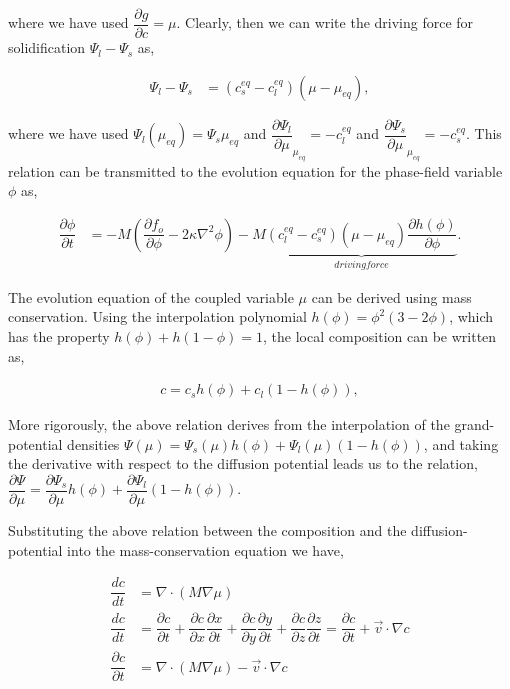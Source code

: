 \documentclass[a4paper]{report}
\begin{document}
  where we have used $\dfrac{\partial g}{\partial c}=\mu$. Clearly, then we can write 
  the driving force for solidification $\Psi_l-\Psi_s$ as,
  
  \begin{align}
   \Psi_l-\Psi_s &= (c_s^{eq} - c_l^{eq})\left(\mu-\mu_{eq}\right),
  \end{align}
  
  where we have used $\Psi_l\left(\mu_{eq}\right) = \Psi_s{\mu_{eq}}$ and $\dfrac{\partial \Psi_l}{\partial \mu}_{\mu_{eq}} = -c_l^{eq}$
  and $\dfrac{\partial \Psi_s}{\partial \mu}_{\mu_{eq}} = -c_s^{eq}$. This relation can be 
  transmitted to the evolution equation for the phase-field variable $\phi$ as,
  
  \begin{align}
  \dfrac{\partial \phi}{\partial t} &= -M \left(\dfrac{\partial f_o}{\partial \phi} - 2\kappa\nabla^{2}\phi\right)  
					-M\underbrace{(c_l^{eq} - c_s^{eq})\left(\mu-\mu_{eq}\right)\dfrac{\partial h\left(\phi\right)}{\partial \phi}}_{driving force}.
  \end{align}

  The evolution equation of the coupled variable $\mu$ can be derived using mass conservation. 
  Using the interpolation polynomial $h(\phi) = \phi^2\left(3 - 2\phi\right)$, which has the 
  property $h(\phi) + h(1 - \phi) = 1$, the local composition can be written as, 
  
  \begin{align}
   c = c_s h\left(\phi\right) + c_l (1 - h\left(\phi\right)), 
  \end{align}
  
  More rigorously, the above relation derives from the 
  interpolation of the grand-potential densities $\Psi\left(\mu\right) = 
  \Psi_s\left(\mu\right) h\left(\phi\right) + \Psi_l\left(\mu\right) (1 - h\left(\phi\right))$,
  and taking the derivative with respect to the diffusion potential leads us to the relation, 
  $\dfrac{\partial \Psi}{\partial \mu} = \dfrac{\partial \Psi_s}{\partial \mu} h\left(\phi\right) 
  + \dfrac{\partial \Psi_l}{\partial \mu} (1-h\left(\phi\right))$.
 
 Substituting the above relation between the composition and the diffusion-potential
 into the mass-conservation equation we have, 

\begin{align}
 \dfrac{dc}{dt} &= \nabla\cdot\left(M\nabla\mu\right)\\
	\dfrac{dc}{dt} &= \dfrac{\partial c}{\partial t} + \dfrac{\partial c}{\partial x}\dfrac{\partial x}{\partial t}
	+\dfrac{\partial c}{\partial y}\dfrac{\partial y}{\partial t}+\dfrac{\partial c}{\partial z}\dfrac{\partial z}{\partial t}
	= \dfrac{\partial c}{\partial t} + \vec{v}\cdot\nabla c\\
	\dfrac{\partial c}{\partial t} &= \nabla\cdot\left(M\nabla\mu\right) - \vec{v}\cdot\nabla c
\label{mass-conservation}
\end{align}
\end{document}
